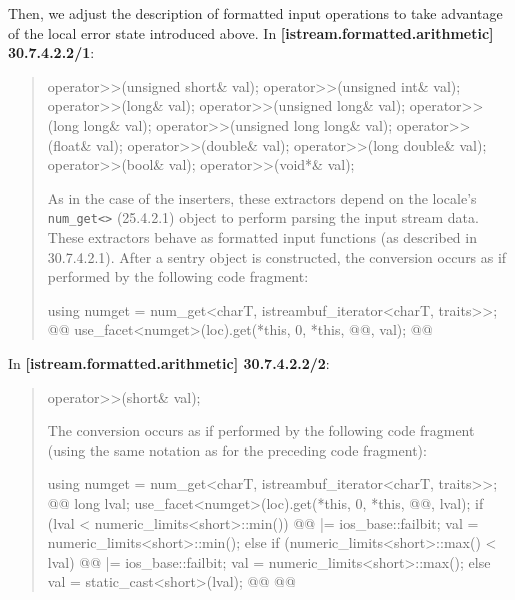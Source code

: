 \documentclass{wg21}
\begin{document}
Then, we adjust the description of formatted input operations to take advantage
of the local error state introduced above. In \textbf{[istream.formatted.arithmetic]
30.7.4.2.2/1}:
\begin{quote}
\begin{codeblock}
operator>>(unsigned short& val);
operator>>(unsigned int& val);
operator>>(long& val);
operator>>(unsigned long& val);
operator>>(long long& val);
operator>>(unsigned long long& val);
operator>>(float& val);
operator>>(double& val);
operator>>(long double& val);
operator>>(bool& val);
operator>>(void*& val);
\end{codeblock}
As in the case of the inserters, these extractors depend on the locale's
\texttt{num_get<>} (25.4.2.1) object to perform parsing the input stream data.
These extractors behave as formatted input functions (as described in 30.7.4.2.1).
After a sentry object is constructed, the conversion occurs as if performed by
the following code fragment:

\begin{codeblock}
  using numget = num_get<charT, istreambuf_iterator<charT, traits>>;
  @@
  use_facet<numget>(loc).get(*this, 0, *this, @@, val);
  @@
\end{codeblock}
\end{quote}

In \textbf{[istream.formatted.arithmetic] 30.7.4.2.2/2}:
\begin{quote}
\begin{codeblock}
operator>>(short& val);
\end{codeblock}
The conversion occurs as if performed by the following code fragment (using the
same notation as for the preceding code fragment):
\begin{codeblock}
  using numget = num_get<charT, istreambuf_iterator<charT, traits>>;
  @@
  long lval;
  use_facet<numget>(loc).get(*this, 0, *this, @@, lval);
  if (lval < numeric_limits<short>::min()) {
    @@ |= ios_base::failbit;
    val = numeric_limits<short>::min();
  } else if (numeric_limits<short>::max() < lval) {
    @@ |= ios_base::failbit;
    val = numeric_limits<short>::max();
  }  else
    val = static_cast<short>(lval);
  @\added{\}}@
  @@
\end{codeblock}
\end{quote}
\end{document}
